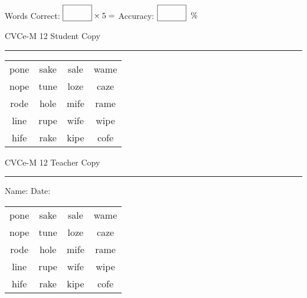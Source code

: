 \documentclass{memoir}
\begin{document}
\small

Words Correct: $\fbox{\phantom{\huge 100}} \times 5 = $ Accuracy: $\fbox{\phantom{\huge 100}}\;\; \%$ 

\vfill

\newpage


\footnotesize \noindent
CVCe-M 12 \hfill Student Copy
\smallskip
\hrule

\Large

\setlength{\tabcolsep}{14pt}
\def\arraystretch{2}

{\selectfont


\begin{vplace}[0.5]
\begin{center}
\begin{tabular}{cccc}
pone & sake & sale & wame \\
nope & tune & loze & caze \\
rode & hole & mife & rame \\
line & rupe & wife & wipe \\
hife & rake & kipe & cofe \\
\end{tabular}
\end{center}
\end{vplace}

}

\newpage

\footnotesize \noindent
CVCe-M 12 \hfill Teacher Copy
\smallskip
\hrule

\small

\vfill

\noindent
Name: \underline{\hspace{1.75in}} \hfill Date: \underline{\hspace{1in}}

\Large

{\selectfont


\begin{vplace}[0.5]
\begin{center}
\begin{tabular}{cccc}
pone & sake & sale & wame \\
nope & tune & loze & caze \\
rode & hole & mife & rame \\
line & rupe & wife & wipe \\
hife & rake & kipe & cofe \\
\end{tabular}
\end{center}
\end{vplace}



}
\end{document}
